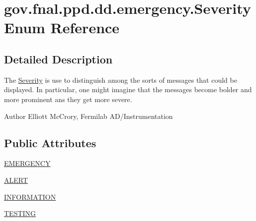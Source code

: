 \hypertarget{enumgov_1_1fnal_1_1ppd_1_1dd_1_1emergency_1_1Severity}{\section{gov.\-fnal.\-ppd.\-dd.\-emergency.\-Severity Enum Reference}
\label{enumgov_1_1fnal_1_1ppd_1_1dd_1_1emergency_1_1Severity}
}


\subsection{Detailed Description}
The \hyperlink{enumgov_1_1fnal_1_1ppd_1_1dd_1_1emergency_1_1Severity}{Severity} is use to distinguish among the sorts of messages that could be displayed. In particular, one might imagine that the messages become bolder and more prominent ans they get more severe.

\begin{DoxyAuthor}{Author}
Elliott Mc\-Crory, Fermilab A\-D/\-Instrumentation 
\end{DoxyAuthor}
\subsection*{Public Attributes}
\begin{DoxyCompactItemize}
\item 
\hyperlink{enumgov_1_1fnal_1_1ppd_1_1dd_1_1emergency_1_1Severity_a611bc0cf1463a7419a9d2cd14c683578}{E\-M\-E\-R\-G\-E\-N\-C\-Y}
\item 
\hyperlink{enumgov_1_1fnal_1_1ppd_1_1dd_1_1emergency_1_1Severity_ab2b0f7c4e6222e22432f49393a71091c}{A\-L\-E\-R\-T}
\item 
\hyperlink{enumgov_1_1fnal_1_1ppd_1_1dd_1_1emergency_1_1Severity_aaf755550765aa7e569baf503397ecd12}{I\-N\-F\-O\-R\-M\-A\-T\-I\-O\-N}
\item 
\hyperlink{enumgov_1_1fnal_1_1ppd_1_1dd_1_1emergency_1_1Severity_ac5e5ede059fb831322252943bb24a7d5}{T\-E\-S\-T\-I\-N\-G}
\end{DoxyCompactItemize}


